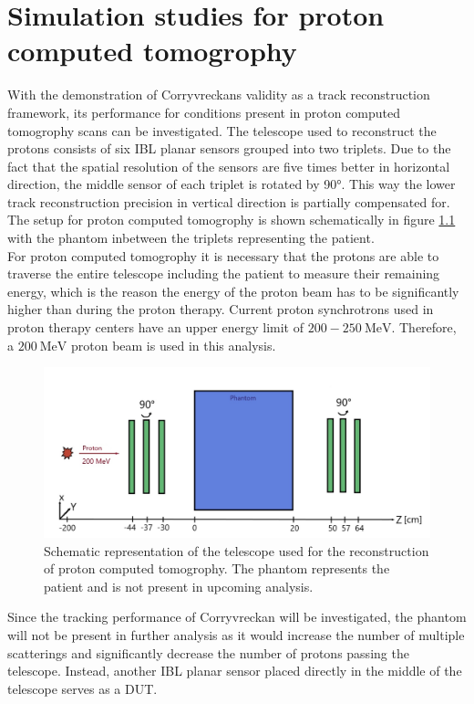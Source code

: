 \chapter{Simulation studies for proton computed tomogrophy}
With the demonstration of Corryvreckans validity as a track reconstruction framework, its performance for conditions present
in proton computed tomogrophy scans can be investigated. The telescope used to reconstruct the protons consists of six IBL planar sensors
grouped into two triplets. Due to the fact that the spatial resolution of the sensors are five times better in horizontal direction, the middle sensor
of each triplet is rotated by 90°. This way the lower track reconstruction precision in vertical direction is partially compensated for.
The setup for proton computed tomogrophy is shown schematically in figure \ref{fig:phantom} with the phantom inbetween the triplets representing
the patient. \\
For proton computed tomogrophy it is necessary that the protons are able to traverse the entire telescope including the patient
to measure their remaining energy, which is the reason the energy of the proton beam has to be significantly higher than during
the proton therapy. Current proton synchrotrons used in proton therapy centers have an upper energy limit of $200 - \SI{250}{\mega\eV}$.
Therefore, a $\SI{200}{\mega\eV}$ proton beam is used in this analysis.

\begin{figure}
  \centering
  \includegraphics[height=0.45\textwidth]{images/phantom_proton_2.jpg}
  \caption{Schematic representation of the telescope used for the reconstruction of proton computed tomogrophy. The phantom represents the
  patient and is not present in upcoming analysis.}
  \label{fig:phantom}
\end{figure}

Since the tracking performance of Corryvreckan will be investigated, the phantom will not be present in further analysis as it would
increase the number of multiple scatterings and significantly decrease the number of protons passing the telescope. Instead, another
IBL planar sensor placed directly in the middle of the telescope serves as a DUT.

